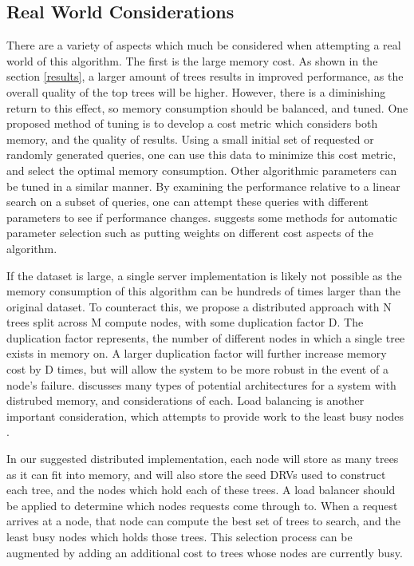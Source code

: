\subsection{Real World Considerations}

There are a variety of aspects which much be considered when attempting a real world of this algorithm.  The first is the large memory cost.  As shown in the section \ref{results}, a larger amount of trees results in improved performance, as the overall quality of the top trees will be higher.  However, there is a diminishing return to this effect, so memory consumption should be balanced, and tuned.  One proposed method of tuning is to develop a cost metric which considers both memory, and the quality of results.  Using a small initial set of requested or randomly generated queries, one can use this data to minimize this cost metric, and select the optimal memory consumption.  Other algorithmic parameters can be tuned in a similar manner.  By examining the performance relative to a linear search on a subset of queries, one can attempt these queries with different parameters to see if performance changes.  \citep{muja_flann_2009} suggests some methods for automatic parameter selection such as putting weights on different cost aspects of the algorithm.

If the dataset is large, a single server implementation is likely not possible as the memory consumption of this algorithm can be hundreds of times larger than the original dataset.  To counteract this, we propose a distributed approach with N trees split across M compute nodes, with some duplication factor D.  The duplication factor represents, the number of different nodes in which a single tree exists in memory on.  A larger duplication factor will further increase memory cost by D times, but will allow the system to be more robust in the event of a node's failure.  \citep{nitzberg1991distributed} discusses many types of potential architectures for a system with distrubed memory, and considerations of each.  Load balancing is another important consideration, which attempts to provide work to the least busy nodes \citep{cybenko1989dynamic}.

In our suggested distributed implementation, each node will store as many trees as it can fit into memory, and will also store the seed DRVs used to construct each tree, and the nodes which hold each of these trees.  A load balancer should be applied to determine which nodes requests come through to.  When a request arrives at a node, that node can compute the best set of trees to search, and the least busy nodes which holds those trees.  This selection process can be augmented by adding an additional cost to trees whose nodes are currently busy.

